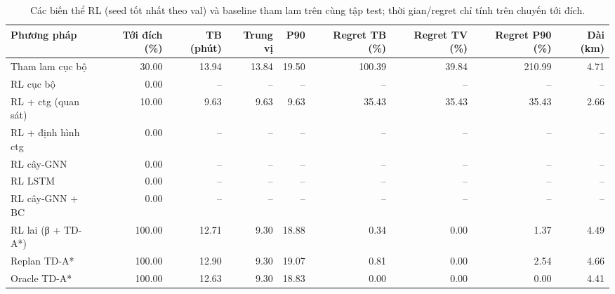 \begin{table}[!htbp]
\centering
\small
\caption{Các biến thể RL (seed tốt nhất theo val) và baseline tham lam trên cùng tập test; thời gian/regret chỉ tính trên chuyến tới đích.}
\label{tab:tab_main_rl}
\begin{adjustbox}{max width=\linewidth}
\begin{tabular}{lrrrrrrrr}
\toprule
Phương pháp & Tới đích (\%) & TB (phút) & Trung vị & P90 & Regret TB (\%) & Regret TV (\%) & Regret P90 (\%) & Dài (km) \\
\midrule
Tham lam cục bộ & 30.00 & 13.94 & 13.84 & 19.50 & 100.39 & 39.84 & 210.99 & 4.71 \\
RL cục bộ & 0.00 & -- & -- & -- & -- & -- & -- & -- \\
RL + ctg (quan sát) & 10.00 & 9.63 & 9.63 & 9.63 & 35.43 & 35.43 & 35.43 & 2.66 \\
RL + định hình ctg & 0.00 & -- & -- & -- & -- & -- & -- & -- \\
RL cây-GNN & 0.00 & -- & -- & -- & -- & -- & -- & -- \\
RL LSTM & 0.00 & -- & -- & -- & -- & -- & -- & -- \\
RL cây-GNN + BC & 0.00 & -- & -- & -- & -- & -- & -- & -- \\
RL lai (β + TD-A*) & 100.00 & 12.71 & 9.30 & 18.88 & 0.34 & 0.00 & 1.37 & 4.49 \\
Replan TD-A* & 100.00 & 12.90 & 9.30 & 19.07 & 0.81 & 0.00 & 2.54 & 4.66 \\
Oracle TD-A* & 100.00 & 12.63 & 9.30 & 18.83 & 0.00 & 0.00 & 0.00 & 4.41 \\
\bottomrule
\end{tabular}
\end{adjustbox}
\end{table}

